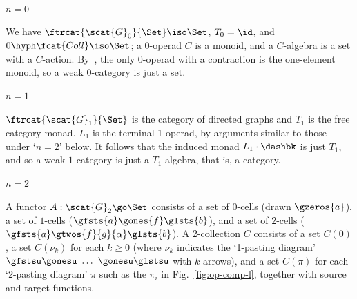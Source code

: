 \paragraph{$n=0$} 

We have $\ftrcat{\scat{G}_0}{\Set} \iso \Set$, $T_0 = \id$, and
$0\hyph\fcat{Coll} \iso \Set$; a 0-operad $C$ is a monoid, and a $C$-algebra
is a set with a $C$-action.  By~, the only
0-operad with a contraction is the one-element monoid, so a weak $0$-category
is just a set.

\paragraph{$n=1$}

$\ftrcat{\scat{G}_1}{\Set}$ is the category of directed graphs and $T_1$ is
the free category monad.  $L_1$ is the terminal 1-operad, by arguments
similar to those under `$n=2$' below.  It follows that the induced monad $L_1
\cdot \dashbk$ is just $T_1$, and so a weak $1$-category is just a
$T_1$-algebra, that is, a category.

\paragraph{$n=2$} 

A functor $A: \scat{G}_2 \go \Set$ consists of a set of $0$-cells (drawn
$\gzeros{a}$), a set of $1$-cells ($\gfsts{a}\gones{f}\glsts{b}$), and a set
of $2$-cells ($\gfsts{a}\gtwos{f}{g}{\alpha}\glsts{b}$).  A 2-collection $C$
consists of a set $C(0)$, a set $C(\nu_k)$ for each $k\geq 0$ (where $\nu_k$
indicates the `1-pasting diagram' $\gfstsu\gonesu\ \ldots\ \gonesu\glstsu$
with $k$ arrows), and a set $C(\pi)$ for each `2-pasting diagram' $\pi$ such
as the $\pi_i$ in Fig.~\ref{fig:op-comp-l}, together with source and target
functions.

